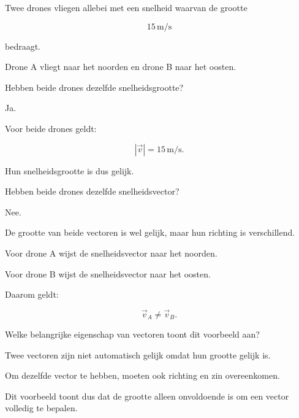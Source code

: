 \documentclass{ximera}
\begin{document}
\begin{oefening}{\oefG}

Twee drones vliegen allebei met een snelheid waarvan de grootte

\[
15\,\si{\meter\per\second}
\]

bedraagt.

Drone A vliegt naar het noorden en drone B naar het oosten.

\begin{question}
Hebben beide drones dezelfde snelheidsgrootte?

\begin{oplossing}
Ja.

Voor beide drones geldt:

\[
|\vec{v}|=15\,\si{\meter\per\second}.
\]

Hun snelheidsgrootte is dus gelijk.
\end{oplossing}
\end{question}


\begin{question}
Hebben beide drones dezelfde snelheidsvector?

\begin{oplossing}
Nee.

De grootte van beide vectoren is wel gelijk, maar hun richting is verschillend.

Voor drone A wijst de snelheidsvector naar het noorden.

Voor drone B wijst de snelheidsvector naar het oosten.

Daarom geldt:

\[
\boxed{\vec{v}_A \neq \vec{v}_B}.
\]
\end{oplossing}
\end{question}


\begin{question}
Welke belangrijke eigenschap van vectoren toont dit voorbeeld aan?

\begin{oplossing}
Twee vectoren zijn niet automatisch gelijk omdat hun grootte gelijk is.

Om dezelfde vector te hebben, moeten ook richting en zin overeenkomen.

Dit voorbeeld toont dus dat de grootte alleen onvoldoende is om een vector
volledig te bepalen.
\end{oplossing}
\end{question}

\end{oefening}
\end{document}
